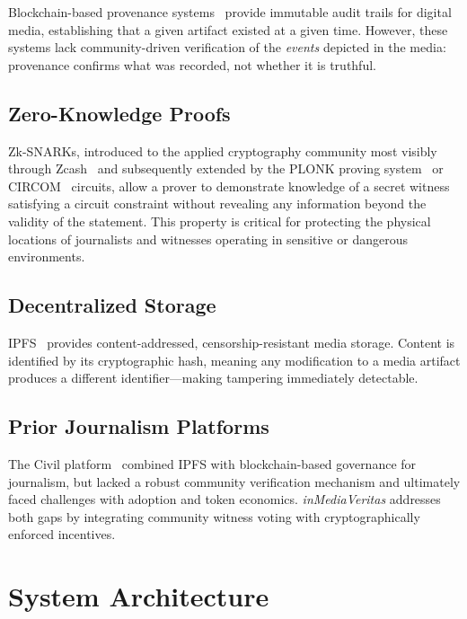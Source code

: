 \documentclass[11pt]{article}
\begin{document}
Blockchain-based provenance systems~\cite{hasan2019} provide immutable audit
trails for digital media, establishing that a given artifact existed at a given
time. However, these systems lack community-driven verification of the
\textit{events} depicted in the media: provenance confirms what was recorded,
not whether it is truthful.

\subsection{Zero-Knowledge Proofs}

Zk-SNARKs, introduced to the applied cryptography community most visibly
through Zcash~\cite{bensasson2014} and subsequently extended by the PLONK
proving system~\cite{gabizon2019} or CIRCOM~\cite{circom} circuits, allow a prover to demonstrate knowledge of
a secret witness satisfying a circuit constraint without revealing any
information beyond the validity of the statement. This property is critical for
protecting the physical locations of journalists and witnesses operating in
sensitive or dangerous environments.

\subsection{Decentralized Storage}

IPFS~\cite{benet2014} provides content-addressed, censorship-resistant media
storage. Content is identified by its cryptographic hash, meaning any
modification to a media artifact produces a different identifier—making
tampering immediately detectable.

\subsection{Prior Journalism Platforms}

The Civil platform~\cite{civil2018} combined IPFS with blockchain-based
governance for journalism, but lacked a robust community verification mechanism
and ultimately faced challenges with adoption and token economics.
\textit{inMediaVeritas} addresses both gaps by integrating community witness
voting with cryptographically enforced incentives.

\section{System Architecture}
\end{document}
